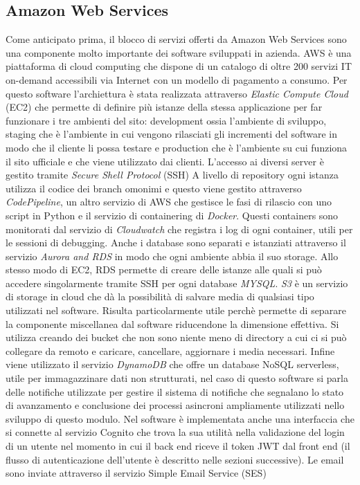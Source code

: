 \documentclass[target=bach,aauheader=,style=]{thud}
\begin{document}
\subsection{Amazon Web Services}
Come anticipato prima, il blocco di servizi offerti da Amazon Web Services sono una componente molto importante dei software sviluppati in azienda.
AWS è una piattaforma di cloud computing che dispone di un catalogo di oltre 200 servizi IT on-demand accessibili via Internet con un modello di pagamento a consumo. Per questo software l'archiettura 
è stata realizzata attraverso \textit{Elastic Compute Cloud} (EC2) che permette di definire più istanze della stessa applicazione per far funzionare i tre ambienti del sito:
development ossia l'ambiente di sviluppo, staging che è l'ambiente in cui vengono rilasciati gli incrementi del software in modo che il cliente li possa testare
e production che è l'ambiente su cui funziona il sito ufficiale e che viene utilizzato dai clienti. L'accesso ai diversi server è gestito tramite \textit{Secure Shell Protocol}\cite{rfc4251} (SSH)
A livello di repository ogni istanza utilizza il codice dei branch omonimi e questo viene gestito attraverso \textit{CodePipeline}, un altro servizio di AWS che gestisce le fasi
di rilascio con uno script in Python e il servizio di containering di \textit{Docker}\cite{docker}. Questi containers sono monitorati dal servizio di \textit{Cloudwatch} che
registra i log di ogni container, utili per le sessioni di debugging. Anche i database sono separati e istanziati attraverso il servizio \textit{Aurora and RDS} in modo che ogni
ambiente abbia il suo storage. Allo stesso modo di EC2, RDS permette di creare delle istanze alle quali si può accedere singolarmente tramite SSH per ogni database \textit{MYSQL}\cite{mysql}.
\textit{S3} è un servizio di storage in cloud che dà la possibilità di salvare media di qualsiasi tipo utilizzati nel software. Risulta particolarmente utile perchè permette di separare
la componente miscellanea dal software riducendone la dimensione effettiva. Si utilizza creando dei bucket che non sono niente meno di directory a cui ci si può collegare
da remoto e caricare, cancellare, aggiornare i media necessari. Infine viene utilizzato il servizio \textit{DynamoDB} che offre un database NoSQL serverless,
utile per immagazzinare dati non strutturati, nel caso di questo software si parla delle notifiche utilizzate per gestire il sistema di notifiche che segnalano lo stato di
avanzamento e conclusione dei processi asincroni ampliamente utilizzati nello sviluppo di questo modulo.
Nel software è implementata anche una interfaccia che si connette al servizio Cognito che trova la sua utilità nella validazione del login di un utente nel momento in cui il back end
riceve il token JWT dal front end (il flusso di autenticazione dell'utente è descritto nelle sezioni successive).
Le email sono inviate attraverso il servizio Simple Email Service (SES) 
\end{document}
